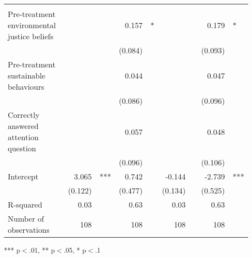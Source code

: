 \documentclass{article}
\begin{document}
\begin{table}[!h]
\begin{tabular}{lllllllll}
  \multicolumn{1}{l}{} \\
\multicolumn{1}{l}{Pre-treatment environmental justice beliefs} &
  \multicolumn{1}{r}{} &
  \multicolumn{1}{l}{} &
  \multicolumn{1}{r}{0.157} &
  \multicolumn{1}{l}{*} &
  \multicolumn{1}{r}{} &
  \multicolumn{1}{l}{} &
  \multicolumn{1}{r}{0.179} &
  \multicolumn{1}{l}{*} \\
\multicolumn{1}{l}{} &
  \multicolumn{1}{r}{} &
  \multicolumn{1}{l}{} &
  \multicolumn{1}{r}{(0.084)} &
  \multicolumn{1}{l}{} &
  \multicolumn{1}{r}{} &
  \multicolumn{1}{l}{} &
  \multicolumn{1}{r}{(0.093)} &
  \multicolumn{1}{l}{} \\
\multicolumn{1}{l}{Pre-treatment sustainable behaviours} &
  \multicolumn{1}{r}{} &
  \multicolumn{1}{l}{} &
  \multicolumn{1}{r}{0.044} &
  \multicolumn{1}{l}{} &
  \multicolumn{1}{r}{} &
  \multicolumn{1}{l}{} &
  \multicolumn{1}{r}{0.047} &
  \multicolumn{1}{l}{} \\
\multicolumn{1}{l}{} &
  \multicolumn{1}{r}{} &
  \multicolumn{1}{l}{} &
  \multicolumn{1}{r}{(0.086)} &
  \multicolumn{1}{l}{} &
  \multicolumn{1}{r}{} &
  \multicolumn{1}{l}{} &
  \multicolumn{1}{r}{(0.096)} &
  \multicolumn{1}{l}{} \\
\multicolumn{1}{l}{Correctly answered attention question} &
  \multicolumn{1}{r}{} &
  \multicolumn{1}{l}{} &
  \multicolumn{1}{r}{0.057} &
  \multicolumn{1}{l}{} &
  \multicolumn{1}{r}{} &
  \multicolumn{1}{l}{} &
  \multicolumn{1}{r}{0.048} &
  \multicolumn{1}{l}{} \\
\multicolumn{1}{l}{} &
  \multicolumn{1}{r}{} &
  \multicolumn{1}{l}{} &
  \multicolumn{1}{r}{(0.096)} &
  \multicolumn{1}{l}{} &
  \multicolumn{1}{r}{} &
  \multicolumn{1}{l}{} &
  \multicolumn{1}{r}{(0.106)} &
  \multicolumn{1}{l}{} \\
\multicolumn{1}{l}{Intercept} &
  \multicolumn{1}{r}{3.065} &
  \multicolumn{1}{l}{***} &
  \multicolumn{1}{r}{0.742} &
  \multicolumn{1}{l}{} &
  \multicolumn{1}{r}{-0.144} &
  \multicolumn{1}{l}{} &
  \multicolumn{1}{r}{-2.739} &
  \multicolumn{1}{l}{***} \\
\multicolumn{1}{l}{} &
  \multicolumn{1}{r}{(0.122)} &
  \multicolumn{1}{l}{} &
  \multicolumn{1}{r}{(0.477)} &
  \multicolumn{1}{l}{} &
  \multicolumn{1}{r}{(0.134)} &
  \multicolumn{1}{l}{} &
  \multicolumn{1}{r}{(0.525)} &
  \multicolumn{1}{l}{} \\
\multicolumn{1}{l}{R-squared} &
  \multicolumn{1}{r}{0.03} &
  \multicolumn{1}{l}{} &
  \multicolumn{1}{r}{0.63} &
  \multicolumn{1}{l}{} &
  \multicolumn{1}{r}{0.03} &
  \multicolumn{1}{l}{} &
  \multicolumn{1}{r}{0.63} &
  \multicolumn{1}{l}{} \\
\multicolumn{1}{l}{Number of observations} &
  \multicolumn{1}{r}{108} &
  \multicolumn{1}{l}{} &
  \multicolumn{1}{r}{108} &
  \multicolumn{1}{l}{} &
  \multicolumn{1}{r}{108} &
  \multicolumn{1}{l}{} &
  \multicolumn{1}{r}{108} &
  \multicolumn{1}{l}{} \\
\cline{1-9}
\end{tabular}

\footnotesize{
*** p$<$.01, ** p$<$.05, * p$<$.1
}
\end{table}
\end{document}
